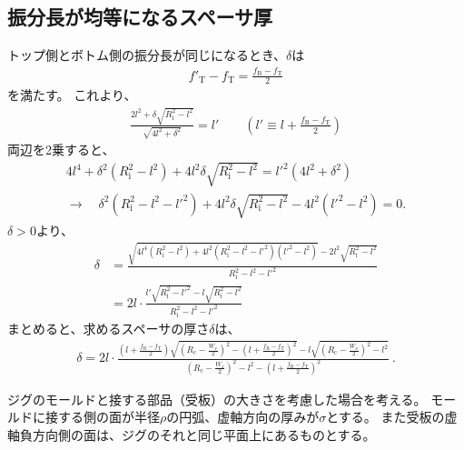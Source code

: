 \subsection{振分長が均等になるスペーサ厚}
トップ側とボトム側の振分長が同じになるとき、$\delta$は
\begin{align*}
  f'_\mathrm T - f_\mathrm T = \frac{f_\mathrm B - f_\mathrm T}2
\end{align*}
を満たす。
これより、
\begin{align*}
  \frac{2l^2+\delta\sqrt{R_\mathrm i^2-l^2}}{\sqrt{4l^2+\delta^2}} = l'\qquad
  \left(l' \equiv l + \frac{f_\mathrm B-f_\mathrm T}2\right)
\end{align*}
両辺を2乗すると、
\begin{gather*}
  4l^4+\delta^2\left(R_\mathrm i^2-l^2\right)+4l^2\delta\sqrt{R_\mathrm i^2-l^2}
  = l'^2\left(4l^2+\delta^2\right)\\
  \longrightarrow\quad
  \delta^2\left(R_\mathrm i^2-l^2-l'^2\right)
  +4l^2\delta\sqrt{R_\mathrm i^2-l^2} -4l^2\left(l'^2 - l^2\right)
  = 0.
\end{gather*}
$\delta > 0$より、
\begin{align*}
  \delta
  &= \frac{\sqrt{4l^4\left(R_\mathrm i^2-l^2\right)
                 +4l^2\left(R_\mathrm i^2-l^2-l'^2\right)\left(l'^2 - l^2\right)}
           -2l^2\sqrt{R_\mathrm i^2-l^2}}{R_\mathrm i^2-l^2-l'^2}\\
  &= 2l\cdot\frac{l'\sqrt{R_\mathrm i^2-l'^2}-l\sqrt{R_\mathrm i^2-l^2}}{R_\mathrm i^2-l^2-l'^2}
\end{align*}
まとめると、求めるスペーサの厚さ$\delta$は、
\begin{align*}
  \delta
  = 2l\cdot
    \frac{\displaystyle
          \left(l+\frac{f_\mathrm B-f_\mathrm T}2\right)\!
          \sqrt{\left(R_\mathrm c-\frac{W_x}2\right)^{\!\!2}
                -\left(l+\frac{f_\mathrm B-f_\mathrm T}2\right)^{\!\!2}}
          -l\sqrt{\left(R_\mathrm c-\frac{W_x}2\right)^{\!\!2}-l^2}}
         {\displaystyle
          \left(R_\mathrm c-\frac{W_x}2\right)^{\!\!2}-l^2
          -\left(l+\frac{f_\mathrm B-f_\mathrm T}2\right)^{\!\!2}}~.
\end{align*}




\clearpage
ジグのモールドと接する部品（受板）の大きさを考慮した場合を考える。
モールドに接する側の面が半径$\rho$の円弧、虚軸方向の厚みが$\sigma$とする。
また受板の虚軸負方向側の面は、ジグのそれと同じ平面上にあるものとする。

